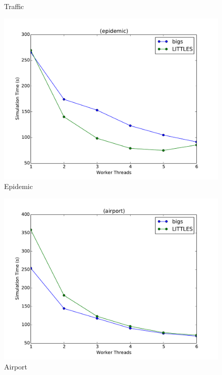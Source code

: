 \documentclass[11pt]{book}
\begin{document}
\begin{figure}
\begin{minipage}{.5\textwidth}
\begin{center}
      Traffic \\
    \end{center}
  \end{minipage}
  \begin{minipage}{.5\textwidth}
    \begin{center}
      \includegraphics[width=\textwidth,keepaspectratio,quiet]{figs/big_little/epidemic_rr.pdf} \\
      Epidemic \\
    \end{center}
  \end{minipage}%
  \hfill
  \begin{minipage}{.5\textwidth}
    \begin{center}
      \includegraphics[width=\textwidth,keepaspectratio,quiet]{figs/big_little/airport_rr.pdf} \\
      Airport \\
    \end{center}
  \end{minipage}
\end{figure}
\end{document}
